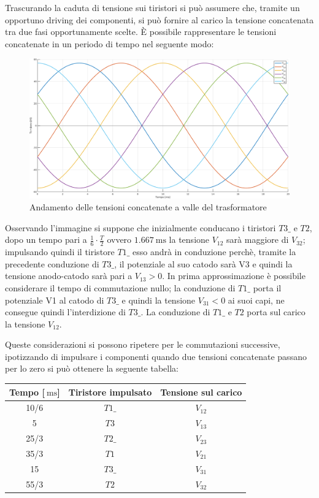 \documentclass[a4paper,10pt]{article}
\begin{document}
Trascurando la caduta di tensione sui tiristori si può assumere che, tramite un
opportuno driving dei componenti, si può fornire al carico la tensione
concatenata tra due fasi opportunamente scelte.
È possibile rappresentare le tensioni concatenate in un periodo di tempo nel seguente modo:
 \begin{figure}[H]
 \centering
 \includegraphics[keepaspectratio=true,width=0.95\linewidth]
 {concatenate_carico.png}
 \caption{Andamento delle tensioni concatenate a valle del trasformatore}
 \label{fig:concatenate}
\end{figure}

Osservando l'immagine si suppone che inizialmente conducano i tiristori \(T3\_\) e \(T2\),
dopo un tempo pari a \(\frac{1}{6}\cdot \frac{T}{2}\) ovvero 
$\SI{1.667}{\milli\second}$ la tensione \(V_{12}\) sarà maggiore 
di \(V_{32}\); impulsando quindi il tiristore \(T1\_\) esso andrà in conduzione perchè, tramite 
la precedente conduzione di \(T3\_\), il potenziale al suo catodo sarà V3 e quindi la tensione 
anodo-catodo sarà pari a \(V_{13} > 0 \).
In prima approssimazione è possibile considerare il tempo di commutazione nullo;
la conduzione di \(T1\_\) porta il potenziale V1 al catodo di \(T3\_\) e 
quindi la tensione \(V_{31} < 0\) ai suoi capi, ne consegue quindi
l'interdizione di \(T3\_\).
La conduzione di \(T1\_\) e \(T2\) porta sul carico la tensione \(V_{12}\).
\smallskip

Queste considerazioni si possono ripetere per le commutazioni successive, ipotizzando
di impulsare i componenti quando due tensioni concatenate passano per lo zero si può 
ottenere la seguente tabella:

\begin{center}
\begin{tabular}{c|c|c}
  Tempo [$\SI{}{\milli\second}$]&Tiristore impulsato&Tensione sul carico\\ \hline
  10/6 & \(T1\_\) & \(V_{12}\) \\
  5    & \(T3\)   & \(V_{13}\) \\
  25/3 & \(T2\_\) & \(V_{23}\) \\
  35/3 & \(T1\)   & \(V_{21}\) \\
  15   & \(T3\_\) & \(V_{31}\) \\
  55/3 & \(T2\)   & \(V_{32}\)
\end{tabular}
\end{center}
\end{document}
